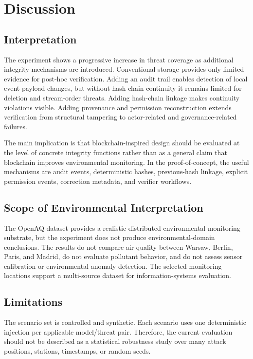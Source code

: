 \section{Discussion}

\subsection{Interpretation}

The experiment shows a progressive increase in threat coverage as additional integrity mechanisms are introduced. Conventional storage provides only limited evidence for post-hoc verification. Adding an audit trail enables detection of local event payload changes, but without hash-chain continuity it remains limited for deletion and stream-order threats. Adding hash-chain linkage makes continuity violations visible. Adding provenance and permission reconstruction extends verification from structural tampering to actor-related and governance-related failures.

The main implication is that blockchain-inspired design should be evaluated at the level of concrete integrity functions rather than as a general claim that blockchain improves environmental monitoring. In the proof-of-concept, the useful mechanisms are audit events, deterministic hashes, previous-hash linkage, explicit permission events, correction metadata, and verifier workflows.

\subsection{Scope of Environmental Interpretation}

The OpenAQ dataset provides a realistic distributed environmental monitoring substrate, but the experiment does not produce environmental-domain conclusions. The results do not compare air quality between Warsaw, Berlin, Paris, and Madrid, do not evaluate pollutant behavior, and do not assess sensor calibration or environmental anomaly detection. The selected monitoring locations support a multi-source dataset for information-systems evaluation.

\subsection{Limitations}

The scenario set is controlled and synthetic. Each scenario uses one deterministic injection per applicable model/threat pair. Therefore, the current evaluation should not be described as a statistical robustness study over many attack positions, stations, timestamps, or random seeds.


